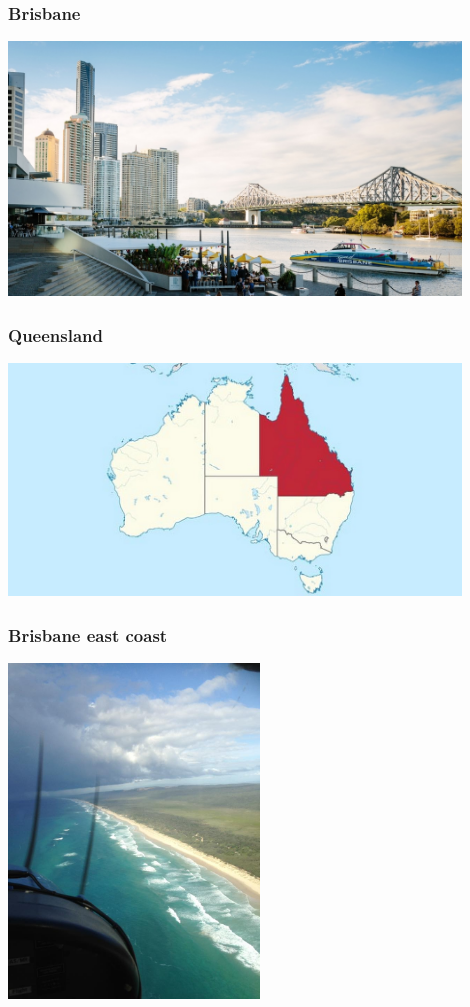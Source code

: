 \begin{frame}
\frametitle{Brisbane}
\begin{center}
\includegraphics[width=0.9\textwidth]{image/brisbane.jpg}
\end{center}
\end{frame}

\begin{frame}
\frametitle{Queensland}
\begin{center}
\includegraphics[width=0.9\textwidth]{image/queensland.jpg}
\end{center}
\end{frame}

\begin{frame}
\frametitle{Brisbane east coast}
\begin{center}
\includegraphics[width=0.5\textwidth]{image/20180420-vh-afr_00.jpg}
\end{center}
\end{frame}

